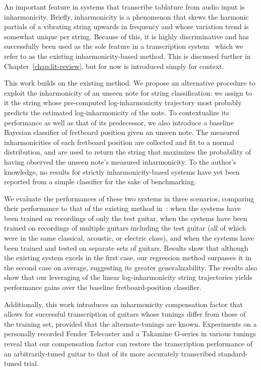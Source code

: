 \documentclass[12pt]{cmuthesis}
\begin{document}
An important feature in systems that transcribe tablature from audio input is inharmonicity. Briefly, inharmonicity is a phenomenon that skews the harmonic partials of a vibrating string upwards in frequency and whose variation trend is somewhat unique per string. Because of this, it is highly discriminative and has successfully been used as the sole feature in a transcription system~\cite{barbanchoi2012} which we refer to as the existing inharmonicity-based method. This is discussed further in Chapter~\ref{chap:lit-review}, but for now is introduced simply for context.

This work builds on the existing method. We propose an alternative procedure to exploit the inharmonicity of an unseen note for string classification: we assign to it the string whose pre-computed log-inharmonicity trajectory most probably predicts the estimated log-inharmonicity of the note. To contextualize its performance as well as that of its predecessor, we also introduce a baseline Bayesian classifier of fretboard position given an unseen note. The measured inharmonicities of each fretboard position are collected and fit to a normal distribution, and are used to return the string that maximizes the probability of having observed the unseen note's measured inharmonicity. To the author's knowledge, no results for strictly inharmonicity-based systems have yet been reported from a simple classifier for the sake of benchmarking. 

We evaluate the performances of these two systems in three scenarios, comparing their performance to that of the existing method in~\cite{barbanchoi2012}: when the systems have been trained on recordings of only the test guitar, when the systems have been trained on recordings of multiple guitars including the test guitar (all of which were in the same classical, acoustic, or electric class), and when the systems have been trained and tested on separate sets of guitars. Results show that although the existing system excels in the first case, our regression method surpasses it in the second case on average, suggesting its greater generalizability. The results also show that our leveraging of the linear log-inharmonicity string trajectories yields performance gains over the baseline fretboard-position classifier.

Additionally, this work introduces an inharmonicity compensation factor that allows for successful transcription of guitars whose tunings differ from those of the training set, provided that the alternate-tunings are known. Experiments on a personally recorded Fender Telecaster and a Takamine G-series in various tunings reveal that our compensation factor can restore the transcription performance of an arbitrarily-tuned guitar to that of its more accurately transcribed standard-tuned trial.
\end{document}
